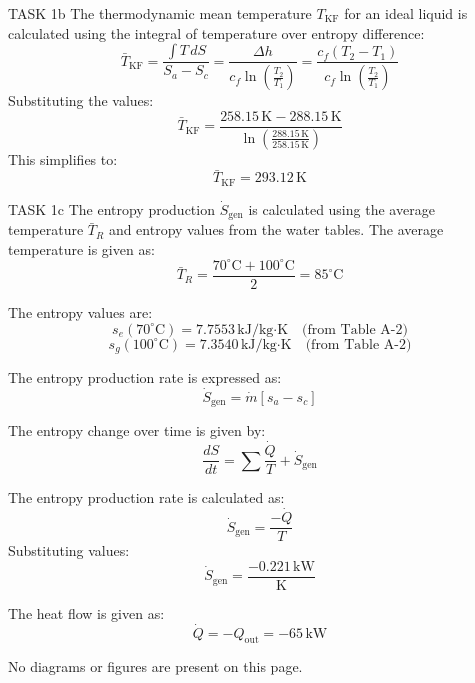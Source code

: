 TASK 1b  
The thermodynamic mean temperature \( T_{\text{KF}} \) for an ideal liquid is calculated using the integral of temperature over entropy difference:  
\[
\bar{T}_{\text{KF}} = \frac{\int T \, dS}{S_a - S_c} = \frac{\Delta h}{c_f \ln \left( \frac{T_2}{T_1} \right)} = \frac{c_f (T_2 - T_1)}{c_f \ln \left( \frac{T_2}{T_1} \right)}
\]  
Substituting the values:  
\[
\bar{T}_{\text{KF}} = \frac{258.15 \, \text{K} - 288.15 \, \text{K}}{\ln \left( \frac{288.15 \, \text{K}}{258.15 \, \text{K}} \right)}
\]  
This simplifies to:  
\[
\bar{T}_{\text{KF}} = 293.12 \, \text{K}
\]  

TASK 1c  
The entropy production \( \dot{S}_{\text{gen}} \) is calculated using the average temperature \( \bar{T}_R \) and entropy values from the water tables. The average temperature is given as:  
\[
\bar{T}_R = \frac{70^\circ\text{C} + 100^\circ\text{C}}{2} = 85^\circ\text{C}
\]  

The entropy values are:  
\[
s_e(70^\circ\text{C}) = 7.7553 \, \text{kJ/kg·K} \quad \text{(from Table A-2)}
\]  
\[
s_g(100^\circ\text{C}) = 7.3540 \, \text{kJ/kg·K} \quad \text{(from Table A-2)}
\]  

The entropy production rate is expressed as:  
\[
\dot{S}_{\text{gen}} = \dot{m} \left[ s_a - s_c \right]
\]  

The entropy change over time is given by:  
\[
\frac{dS}{dt} = \sum \frac{\dot{Q}}{T} + \dot{S}_{\text{gen}}
\]  

The entropy production rate is calculated as:  
\[
\dot{S}_{\text{gen}} = \frac{-\dot{Q}}{T}
\]  
Substituting values:  
\[
\dot{S}_{\text{gen}} = \frac{-0.221 \, \text{kW}}{\text{K}}
\]  

The heat flow is given as:  
\[
\dot{Q} = -Q_{\text{out}} = -65 \, \text{kW}
\]  

No diagrams or figures are present on this page.